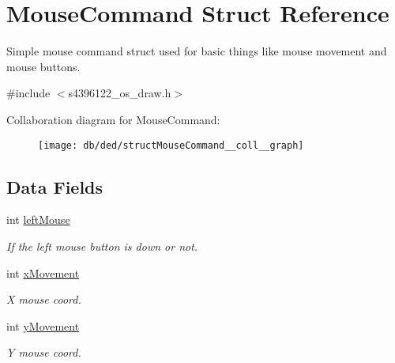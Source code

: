 \hypertarget{structMouseCommand}{}\section{Mouse\+Command Struct Reference}
\label{structMouseCommand}


Simple mouse command struct used for basic things like mouse movement and mouse buttons.  




{\ttfamily \#include $<$s4396122\+\_\+os\+\_\+draw.\+h$>$}



Collaboration diagram for Mouse\+Command\+:\nopagebreak
\begin{figure}[H]
\begin{center}
\leavevmode
\texttt{[image: db/ded/structMouseCommand\_\_coll\_\_graph]}
\end{center}
\end{figure}
\subsection*{Data Fields}
\begin{DoxyCompactItemize}
\item 
int \hyperlink{structMouseCommand_afef1023fdb35d2320a6fe785ac391d33}{left\+Mouse}\hypertarget{structMouseCommand_afef1023fdb35d2320a6fe785ac391d33}{}\label{structMouseCommand_afef1023fdb35d2320a6fe785ac391d33}

\begin{DoxyCompactList}\small\item\em If the left mouse button is down or not. \end{DoxyCompactList}\item 
int \hyperlink{structMouseCommand_ab6f61004ed3bf7be2db14871ea2e5d45}{x\+Movement}\hypertarget{structMouseCommand_ab6f61004ed3bf7be2db14871ea2e5d45}{}\label{structMouseCommand_ab6f61004ed3bf7be2db14871ea2e5d45}

\begin{DoxyCompactList}\small\item\em X mouse coord. \end{DoxyCompactList}\item 
int \hyperlink{structMouseCommand_aece464c7fd066912b6bd0d08ba825a64}{y\+Movement}\hypertarget{structMouseCommand_aece464c7fd066912b6bd0d08ba825a64}{}\label{structMouseCommand_aece464c7fd066912b6bd0d08ba825a64}

\begin{DoxyCompactList}\small\item\em Y mouse coord. \end{DoxyCompactList}\end{DoxyCompactItemize}


